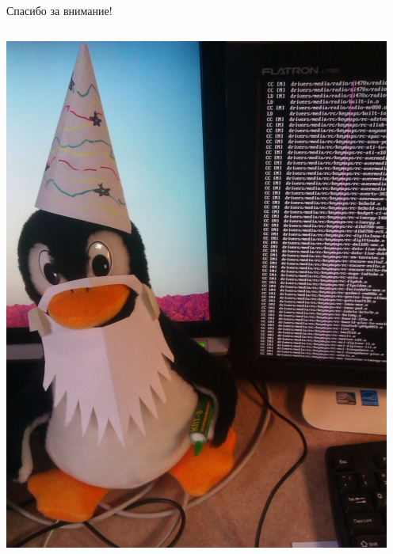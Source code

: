 \documentclass[presentation]{beamer}
\begin{document}
\begin{frame}[label=sec-3-1-2]{Спасибо за внимание!}
  \begin{columns}
    \begin{column}{0.5\textwidth}
      \includegraphics[width=.9\linewidth]{./graphics/tux.jpg}
    \end{column}
  \end{columns}
\end{frame}
\end{document}
